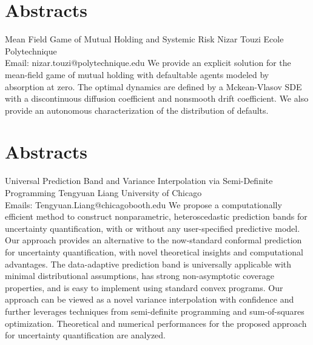 \documentclass[
	openany, %
	parskip=full, %
	12pt, %
	a4paper, %
]{conferencebooklet} %
\begin{document}
\chapter*{Abstracts}
\abstract
    {Mean Field Game of Mutual Holding and Systemic Risk}
    {Nizar Touzi}
    {}
    {Ecole Polytechnique\\
    Email: nizar.touzi@polytechnique.edu}
    {We provide an explicit solution for the mean-field game of mutual holding with defaultable agents modeled by absorption at zero. The optimal dynamics are defined by a Mckean-Vlasov SDE with a discontinuous diffusion coefficient and nonsmooth drift coefficient. We also provide an autonomous characterization of the distribution of defaults.}



\chapter*{Abstracts}
\abstract
    {Universal Prediction Band and Variance Interpolation via Semi-Definite Programming}
    {Tengyuan Liang}
    {}
    {University of Chicago\\
    Emails: Tengyuan.Liang@chicagobooth.edu}
    {We propose a computationally efficient method to construct nonparametric, heteroscedastic prediction bands for uncertainty quantification, with or without any user-specified predictive model. Our approach provides an alternative to the now-standard conformal prediction for uncertainty quantification, with novel theoretical insights and computational advantages. The data-adaptive prediction band is universally applicable with minimal distributional assumptions, has strong non-asymptotic coverage properties, and is easy to implement using standard convex programs. Our approach can be viewed as a novel variance interpolation with confidence and further leverages techniques from semi-definite programming and sum-of-squares optimization. Theoretical and numerical performances for the proposed approach for uncertainty quantification are analyzed.}
\end{document}
